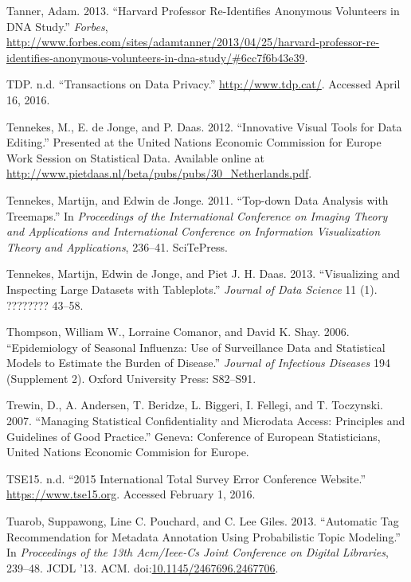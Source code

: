 \documentclass[]{krantz}
\begin{document}
\hypertarget{ref-forbesharvard}{}
Tanner, Adam. 2013. ``Harvard Professor Re-Identifies Anonymous
Volunteers in DNA Study.'' \emph{Forbes},
\url{http://www.forbes.com/sites/adamtanner/2013/04/25/harvard-professor-re-identifies-anonymous-volunteers-in-dna-study/\#6cc7f6b43e39}.

\hypertarget{ref-TransactionsonDataPrivacy}{}
TDP. n.d. ``Transactions on Data Privacy.'' \url{http://www.tdp.cat/}.
Accessed April 16, 2016.

\hypertarget{ref-Tennekes2012}{}
Tennekes, M., E. de Jonge, and P. Daas. 2012. ``Innovative Visual Tools
for Data Editing.'' Presented at the United Nations Economic Commission
for Europe Work Session on Statistical Data. Available online at
\url{http://www.pietdaas.nl/beta/pubs/pubs/30_Netherlands.pdf}.

\hypertarget{ref-tennekes2011top}{}
Tennekes, Martijn, and Edwin de Jonge. 2011. ``Top-down Data Analysis
with Treemaps.'' In \emph{Proceedings of the International Conference on
Imaging Theory and Applications and International Conference on
Information Visualization Theory and Applications}, 236--41. SciTePress.

\hypertarget{ref-tennekes2013visualizing}{}
Tennekes, Martijn, Edwin de Jonge, and Piet J. H. Daas. 2013.
``Visualizing and Inspecting Large Datasets with Tableplots.''
\emph{Journal of Data Science} 11 (1). ???????? 43--58.

\hypertarget{ref-thompson2006epidemiology}{}
Thompson, William W., Lorraine Comanor, and David K. Shay. 2006.
``Epidemiology of Seasonal Influenza: Use of Surveillance Data and
Statistical Models to Estimate the Burden of Disease.'' \emph{Journal of
Infectious Diseases} 194 (Supplement 2). Oxford University Press:
S82--S91.

\hypertarget{ref-trewin2007managing}{}
Trewin, D., A. Andersen, T. Beridze, L. Biggeri, I. Fellegi, and T.
Toczynski. 2007. ``Managing Statistical Confidentiality and Microdata
Access: Principles and Guidelines of Good Practice.'' Geneva: Conference
of European Statisticians, United Nations Economic Commision for Europe.

\hypertarget{ref-TSEweb}{}
TSE15. n.d. ``2015 International Total Survey Error Conference
Website.'' \url{https://www.tse15.org}. Accessed February 1, 2016.

\hypertarget{ref-tuarob-13}{}
Tuarob, Suppawong, Line C. Pouchard, and C. Lee Giles. 2013. ``Automatic
Tag Recommendation for Metadata Annotation Using Probabilistic Topic
Modeling.'' In \emph{Proceedings of the 13th Acm/Ieee-Cs Joint
Conference on Digital Libraries}, 239--48. JCDL '13. ACM.
doi:\href{https://doi.org/10.1145/2467696.2467706}{10.1145/2467696.2467706}.
\end{document}
